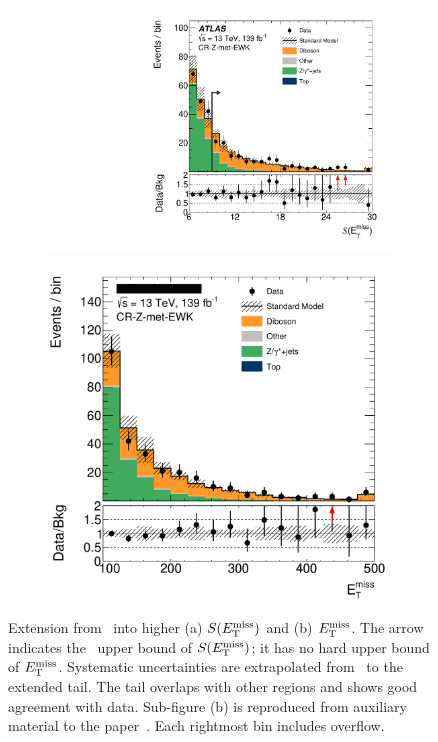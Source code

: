 \begin{figure}[tp]
\centering
\begin{subfigure}{0.48\textwidth}
\centering
\includegraphics[width=\textwidth]{figures/2ljets_aux_CR_Z_met_EWK_met_Sign.pdf}
\caption{}
\label{fig:2ljets_low_crz_extensions_metsig}
\end{subfigure}
\hfill
\begin{subfigure}{0.48\textwidth}
\centering
\includegraphics[width=\textwidth]{figures/2ljets_aux_CR_Z_met_EWK_met_Et.png}
\caption{}
\label{fig:2ljets_low_crz_extensions_met}
\end{subfigure}
\caption[
Extension from CR-Z into higher $\metsig$ and $\met$
]{%
Extension from \crz\ into higher (a) $\metsig$ and (b) $\met$.
The arrow indicates the \crz\  upper bound of $\metsig$; it has no hard
upper bound of $\met$.
Systematic uncertainties are extrapolated from \crz\ to the extended tail.
The tail overlaps with other regions and shows good agreement with data.
Sub-figure (b) is reproduced from auxiliary material to the
paper~\cite{atlas2022searches}.
Each rightmost bin includes overflow.
}
\label{fig:2ljets_low_crz_extensions}
\end{figure}

